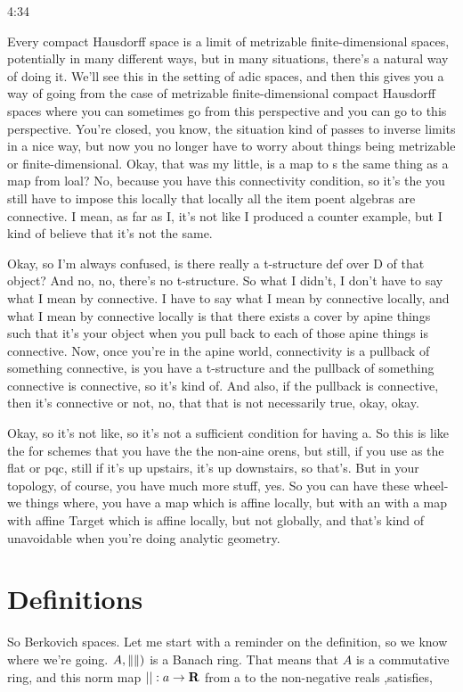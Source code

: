 \begin{unfinished}{4:34}
\begin{example}
Every compact Hausdorff space is a limit of metrizable finite-dimensional spaces, potentially in many different ways, but in many situations, there's a natural way of doing it. We'll see this in the setting of adic spaces, and then this gives you a way of going from the case of metrizable finite-dimensional compact Hausdorff spaces where you can sometimes go from this perspective and you can go to this perspective.
You're closed, you know, the situation kind of passes to inverse limits in a nice way, but now you no longer have to worry about things being metrizable or finite-dimensional. Okay, that was my little, is a map to s the same thing as a map from loal? No, because you have this connectivity condition, so it's the you still have to impose this locally that locally all the item poent algebras are connective. I mean, as far as I, it's not like I produced a counter example, but I kind of believe that it's not the same.

Okay, so I'm always confused, is there really a t-structure def over D of that object? And no, no, there's no t-structure. So what I didn't, I don't have to say what I mean by connective. I have to say what I mean by connective locally, and what I mean by connective locally is that there exists a cover by apine things such that it's your object when you pull back to each of those apine things is connective. Now, once you're in the apine world, connectivity is a pullback of something connective, is you have a t-structure and the pullback of something connective is connective, so it's kind of. And also, if the pullback is connective, then it's connective or not, no, that that is not necessarily true, okay, okay.

Okay, so it's not like, so it's not a sufficient condition for having a. So this is like the for schemes that you have the the non-aine orens, but still, if you use as the flat or pqc, still if it's up upstairs, it's up downstairs, so that's. But in your topology, of course, you have much more stuff, yes. So you can have these wheel-we things where, you have a map which is affine locally, but with an with a map with affine Target which is affine locally, but not globally, and that's kind of unavoidable when you're doing analytic geometry.

\section{Definitions}
So Berkovich spaces. Let me start with a reminder on the definition, so we know where we're going. $A, \left \lVert  \right \rVert)$ is a Banach ring. That means that $A$ is a commutative ring, and this norm map $||: a \rightarrow \mathbf R$  from a to the non-negative reals ,satisfies, 


\end{example}
\end{unfinished}
